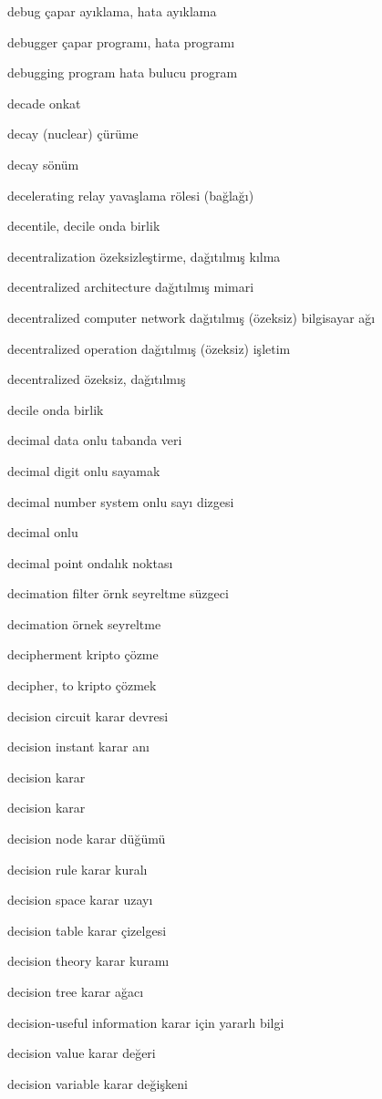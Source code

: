 \documentclass[12pt,fleqn]{article}\usepackage{../../common}
\begin{document}
debug çapar ayıklama, hata ayıklama

debugger çapar programı, hata programı

debugging program hata bulucu program

decade onkat

decay (nuclear) çürüme

decay sönüm

decelerating relay yavaşlama rölesi (bağlağı)

decentile, decile onda birlik

decentralization özeksizleştirme, dağıtılmış kılma

decentralized architecture dağıtılmış mimari

decentralized computer network dağıtılmış (özeksiz) bilgisayar ağı

decentralized operation dağıtılmış (özeksiz) işletim

decentralized özeksiz, dağıtılmış

decile onda birlik

decimal data onlu tabanda veri

decimal digit onlu sayamak

decimal number system onlu sayı dizgesi

decimal onlu

decimal point ondalık noktası

decimation filter örnk seyreltme süzgeci

decimation örnek seyreltme

decipherment kripto çözme

decipher, to kripto çözmek

decision circuit karar devresi

decision instant karar anı

decision karar

decision karar

decision node karar düğümü

decision rule karar kuralı

decision space karar uzayı

decision table karar çizelgesi

decision theory karar kuramı

decision tree karar ağacı

decision-useful information karar için yararlı bilgi

decision value karar değeri

decision variable karar değişkeni
\end{document}
